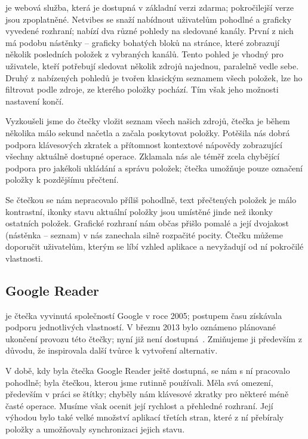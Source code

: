  je webová služba, která je dostupná v základní verzi zdarma; pokročilejší verze jsou zpoplatněné.
Netvibes se snaží nabídnout uživatelům pohodlné a graficky vyvedené rozhraní; nabízí dva různé pohledy na sledované kanály.
První z nich má podobu nástěnky -- graficky bohatých bloků na stránce, které zobrazují několik posledních položek z vybraných kanálů.
Tento pohled je vhodný pro uživatele, kteří potřebují sledovat několik zdrojů najednou, paralelně vedle sebe.
Druhý z nabízených pohledů je tvořen klasickým seznamem všech položek, lze ho filtrovat podle zdroje, ze kterého položky pochází.
Tím však jeho možnosti nastavení končí.

Vyzkoušeli jsme do čtečky vložit seznam všech našich zdrojů, čtečka je během několika málo sekund načetla a začala poskytovat položky.
Potěšila nás dobrá podpora klávesových zkratek a přítomnost kontextové nápovědy zobrazující všechny aktuálně dostupné operace.
Zklamala nás ale téměř zcela chybějící podpora pro jakékoli ukládání a správu položek; čtečka umožňuje pouze označení položky k pozdějšímu přečtení.

Se čtečkou se nám nepracovalo příliš pohodlně, text přečtených položek je málo kontrastní, ikonky stavu aktuální položky jsou umístěné jinde než ikonky ostatních položek.
Grafické rozhraní nám občas přišlo pomalé a její dvojakost (nástěnka -- seznam) v nás zanechala silně rozpačité pocity.
Čtečku můžeme doporučit uživatelům, kterým se líbí vzhled aplikace a nevyžadují od ní pokročilé vlastnosti.

\subsection{Google Reader}

 je čtečka vyvinutá společností Google v roce 2005; postupem času získávala podporu jednotlivých vlastností.
V březnu 2013 bylo oznámeno plánované ukončení provozu této čtečky; nyní již není dostupná~\cite{google-reader-down}.
Zmiňujeme ji především z důvodu, že inspirovala další tvůrce k vytvoření alternativ.

V době, kdy byla čtečka Google Reader ještě dostupná, se nám s ní pracovalo pohodlně; byla čtečkou, kterou jsme rutinně používali.
Měla svá omezení, především v práci se štítky; chyběly nám klávesové zkratky pro některé méně časté operace.
Musíme však ocenit její rychlost a přehledné rozhraní.
Její výhodou bylo také velké množství aplikací třetích stran, které z ní přebíraly položky a umožňovaly synchronizaci jejich stavu.

